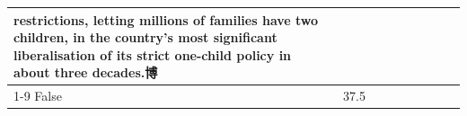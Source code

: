 \begin{table}[H]
\begin{tabular}{lllrlllll}
restrictions, letting millions of families have two children, in the country's most significant liberalisation of its strict one-child policy in about three decades.博 \\
\cline{1-9}
False & 37.5%
\end{tabular}
\end{table}
